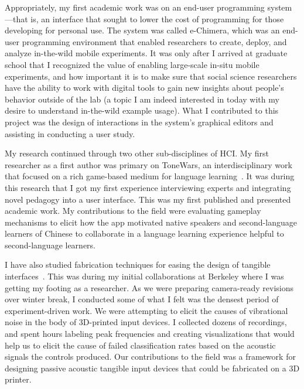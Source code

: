 \documentclass[12pt]{memoir}
\begin{document}


Appropriately, my first academic work was on an end-user programming system---that is, an interface that sought to lower the cost of programming for those developing for personal use.
The system was called e-Chimera, which was an end-user programming environment that enabled researchers to create, deploy, and analyze in-the-wild mobile experiments.
It was only after I arrived at graduate school that I recognized the value of enabling large-scale in-situ mobile experiments, and how important it is to make sure that social science researchers have the ability to work with digital tools to gain new insights about people's behavior outside of the lab (a topic I am indeed interested in today with my desire to understand in-the-wild example usage).
What I contributed to this project was the design of interactions in the system's graphical editors and assisting in conducting a user study.

My research continued through two other sub-disciplines of HCI\@.
My first researcher as a first author was primary on ToneWars, an interdisciplinary work that focused on a rich game-based medium for language learning~\cite{head_tonewars_2014}.
It was during this research that I got my first experience interviewing experts and integrating novel pedagogy into a user interface.
This was my first published and presented academic work.
My contributions to the field were evaluating gameplay mechanisms to elicit how the app motivated native speakers and second-language learners of Chinese to collaborate in a language learning experience helpful to second-language learners.

I have also studied fabrication techniques for easing the design of tangible interfaces~\cite{savage_lamello_2015}.
This was during my initial collaborations at Berkeley where I was getting my footing as a researcher.
As we were preparing camera-ready revisions over winter break, I conducted some of what I felt was the densest period of experiment-driven work.
We were attempting to elicit the causes of vibrational noise in the body of 3D-printed input devices.
I collected dozens of recordings, and spent hours labeling peak frequencies and creating visualizations that would help us to elicit the cause of failed classification rates based on the acoustic signals the controls produced.
Our contributions to the field was a framework for designing passive acoustic tangible input devices that could be fabricated on a 3D printer.
\end{document}

